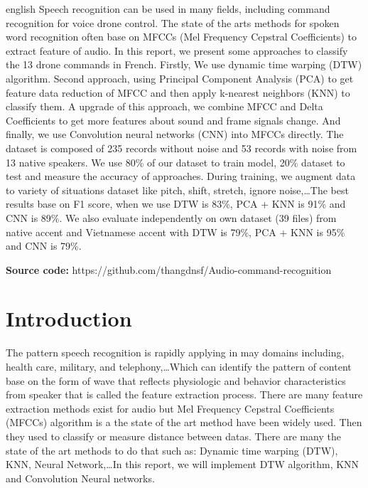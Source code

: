 \documentclass[%
  article,%
  10pt,%
  a4paper,%
  fleqn,%
  oneside,%
  sumario = tradicional,%
  chapter = TITLE,%
  section = TITLE,%
]{abntex2}
\author{
  21906085\\
  Duc Thang, NGUYEN\\
  \texttt{duc-thang.nguyen@univ-tlse3.fr}
  \and
   21902771\\
  Clement, POULL\\
  \texttt{clement.poull@univ-tlse3.fr}
}
\begin{document}
\pretextual%

\begin{paginadetitulo}%

\begin{ambienteresumo}[Abstract]%
\begin{otherlanguage*}{english}%
Speech recognition can be used in many fields, including command recognition for voice drone control. The state of the arts methods for spoken word recognition often base on MFCCs (Mel Frequency Cepstral Coefficients) to extract feature of audio. In this report, we present some approaches to classify the 13 drone commands in French. Firstly, We use dynamic time warping (DTW) algorithm. Second approach, using Principal Component Analysis (PCA) to get feature data reduction of MFCC and then apply k-nearest neighbors (KNN) to classify them. A upgrade of this approach, we combine MFCC and Delta Coefficients to get more features about sound and frame signals change. And finally, we use Convolution neural networks (CNN) into MFCCs directly. The dataset is composed of  235 records without noise and 53 records with noise from 13 native speakers. We use 80\% of our dataset to train model, 20\% dataset to test and measure the accuracy of approaches. During training, we augment data to variety of situations dataset like pitch, shift, stretch, ignore noise,\dots The best results base on F1 score, when we use DTW is 83\%, PCA + KNN is 91\% and CNN is 89\%. We also evaluate independently on own dataset (39 files) from native accent and Vietnamese accent with DTW is 79\%, PCA + KNN is 95\% and CNN is 79\%.

\smallskip

\textbf{Source code:} https://github.com/thangdnsf/Audio-command-recognition

\end{otherlanguage*}
\end{ambienteresumo}

\end{paginadetitulo}

\textual%

\section{Introduction}\label{sec:intro}

The pattern speech recognition is rapidly applying in may domains including, health care, military, and telephony,\dots Which can identify the pattern of content base on the form of wave that reflects physiologic and behavior characteristics from speaker that is called the feature extraction process. There are many feature extraction methods exist for audio but Mel Frequency Cepstral Coefficients (MFCCs) algorithm is a the state of the art method have been widely used. Then they used to classify or measure distance between datas. There are many the state of the art methods to do that such as: Dynamic time warping (DTW), KNN, Neural Network,\dots In this report, we will implement DTW algorithm, KNN and Convolution Neural networks.
\end{document}
